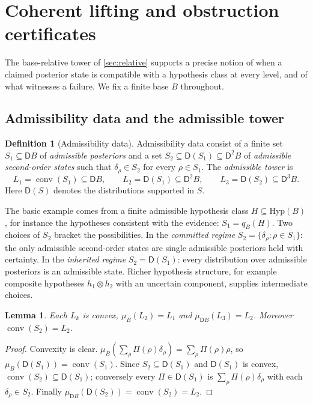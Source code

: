 \documentclass[11pt]{article}
\newtheorem{lemma}[theorem]{Lemma}
\theoremstyle{definition}
\newtheorem{definition}[theorem]{Definition}
\theoremstyle{remark}
\newcommand{\D}{\mathsf{D}}
\newcommand{\Hyp}{\mathrm{Hyp}}
\begin{document}
\section{Coherent lifting and obstruction certificates}\label{sec:lifting}

The base-relative tower of \cref{sec:relative} supports a precise notion of when a claimed posterior
state is compatible with a hypothesis class at every level, and of what witnesses a failure. We fix a
finite base $B$ throughout.

\subsection{Admissibility data and the admissible tower}

\begin{definition}[Admissibility data]\label{def:admdata}
Admissibility data consist of a finite set $S_1\subseteq\D B$ of \emph{admissible posteriors} and a
set $S_2\subseteq\D(S_1)\subseteq\D^2B$ of \emph{admissible second-order states} such that
$\delta_\rho\in S_2$ for every $\rho\in S_1$. The \emph{admissible tower} is
\[
L_1=\operatorname{conv}(S_1)\subseteq\D B,\qquad L_2=\D(S_1)\subseteq\D^2B,\qquad
L_3=\D(S_2)\subseteq\D^3B .
\]
Here $\D(S)$ denotes the distributions supported in $S$.
\end{definition}

The basic example comes from a finite admissible hypothesis class $H\subseteq\Hyp(B)$, for instance
the hypotheses consistent with the evidence: $S_1=q_B(H)$. Two choices of $S_2$ bracket the
possibilities. In the \emph{committed regime} $S_2=\{\delta_\rho:\rho\in S_1\}$: the only admissible
second-order states are single admissible posteriors held with certainty. In the \emph{inherited
regime} $S_2=\D(S_1)$: every distribution over admissible posteriors is an admissible state. Richer
hypothesis structure, for example composite hypotheses $h_1\otimes h_2$ with an uncertain component,
supplies intermediate choices.

\begin{lemma}\label{lem:adm-tower}
Each $L_k$ is convex, $\mu_B(L_2)=L_1$ and $\mu_{\D B}(L_3)=L_2$. Moreover $\operatorname{conv}(S_2)=L_2$.
\end{lemma}
\begin{proof}
Convexity is clear. $\mu_B(\sum_\rho\Pi(\rho)\delta_\rho)=\sum_\rho\Pi(\rho)\rho$, so
$\mu_B(\D(S_1))=\operatorname{conv}(S_1)$. Since $S_2\subseteq\D(S_1)$ and $\D(S_1)$ is convex,
$\operatorname{conv}(S_2)\subseteq\D(S_1)$; conversely every $\Pi\in\D(S_1)$ is
$\sum_\rho\Pi(\rho)\delta_\rho$ with each $\delta_\rho\in S_2$. Finally
$\mu_{\D B}(\D(S_2))=\operatorname{conv}(S_2)=L_2$.
\end{proof}
\end{document}
